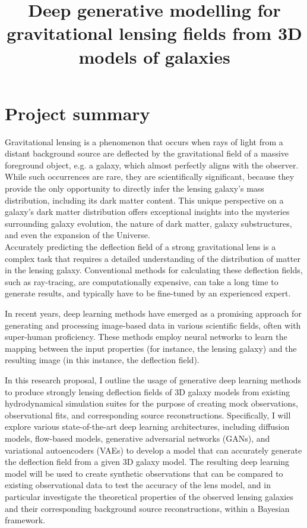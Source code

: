\documentclass[a4paper,10pt]{article}
\date{}
\title{Deep generative modelling for gravitational lensing fields from 3D models of galaxies}
\begin{document}
\maketitle
\vspace{-0.8in}
\section*{Project summary}
\label{sec:orgbaf0205}

Gravitational lensing is a phenomenon that occurs when rays of light
from a distant background source are deflected by the gravitational
field of a massive foreground object, e.g. a galaxy, which almost
perfectly aligns with the observer. While such occurrences are rare,
they are scientifically significant, because they provide the only
opportunity to directly infer the lensing galaxy's mass distribution,
including its dark matter content.  This unique perspective on a
galaxy's dark matter distribution offers exceptional insights into the
mysteries surrounding galaxy evolution, the nature of dark matter,
galaxy substructures, and even the expansion of the Universe. \\[0pt]
Accurately predicting the deflection field of a strong gravitational
lens is a complex task that requires a detailed understanding of the
distribution of matter in the lensing galaxy. Conventional methods for
calculating these deflection fields, such as ray-tracing, are
computationally expensive, can take a long time to generate results,
and typically have to be fine-tuned by an experienced expert.

In recent years, deep learning methods have emerged as a promising
approach for generating and processing image-based data in various
scientific fields, often with super-human proficiency. These methods
employ neural networks to learn the mapping between the input
properties (for instance, the lensing galaxy) and the resulting image
(in this instance, the deflection field).

In this research proposal, I outline the usage of generative deep
learning methods to produce strongly lensing deflection fields of 3D
galaxy models from existing hydrodynamical simulation suites for the
purpose of creating mock observations, observational fits, and
corresponding source reconstructions. Specifically, I will explore
various state-of-the-art deep learning architectures, including
diffusion models, flow-based models, generative adversarial networks
(GANs), and variational autoencoders (VAEs) to develop a model that
can accurately generate the deflection field from a given 3D galaxy
model. The resulting deep learning model will be used to create
synthetic observations that can be compared to existing observational
data to test the accuracy of the lens model, and in particular
investigate the theoretical properties of the observed lensing
galaxies and their corresponding background source reconstructions,
within a Bayesian framework.
\end{document}
